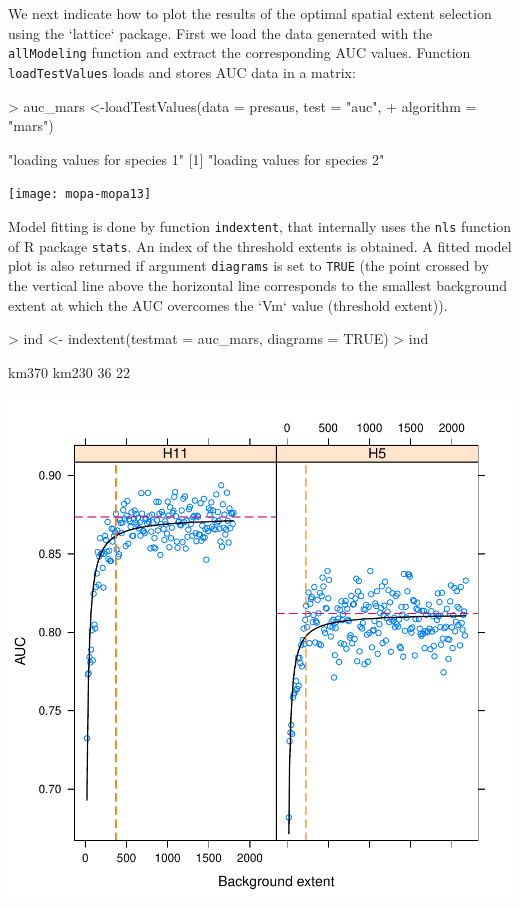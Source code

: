 \documentclass[10pt,a4paper]{report}
\begin{document}
We next indicate how to plot the results of the optimal spatial extent selection using the `lattice` package. First we load the data generated with the  \texttt{allModeling} function and extract the corresponding AUC values. Function  \texttt{loadTestValues} loads and stores AUC data in a matrix:

\begin{Schunk}
\begin{Sinput}
> auc_mars <-loadTestValues(data = presaus, test = "auc", 
+                           algorithm = "mars")
\end{Sinput}
\begin{Soutput}
[1] "loading values for species 1"
[1] "loading values for species 2"
\end{Soutput}
\end{Schunk}
\texttt{[image: mopa-mopa13]}


Model fitting is done by function \texttt{indextent}, that internally uses the  \texttt{nls} function of R package  \texttt{stats}. An index of the threshold extents is obtained. A fitted model plot is also returned if argument  \texttt{diagrams} is set to  \texttt{TRUE} (the point crossed by the vertical line above the horizontal line corresponds to the smallest background extent at which the AUC overcomes the `Vm` value (threshold extent)).

\begin{Schunk}
\begin{Sinput}
> ind <- indextent(testmat = auc_mars, diagrams = TRUE)
> ind
\end{Sinput}
\begin{Soutput}
km370 km230 
   36    22 
\end{Soutput}
\end{Schunk}
\includegraphics{mopa-mopa14}
\end{document}
